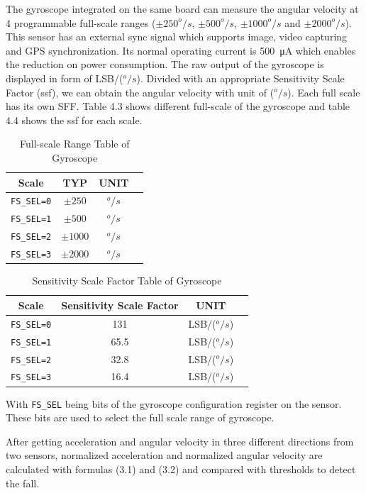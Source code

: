 \documentclass[letterpaper,12pt,titlepage,oneside,final]{book}
\begin{document}
 The gyroscope integrated on the same board can measure the angular velocity at 4 programmable full-scale ranges ($\pm250^{o}/s$, $\pm500^{o}/s$, $\pm1000^{o}/s$ and $\pm2000^{o}/s$). This sensor has an external sync signal which supports image, video capturing and GPS synchronization. Its normal operating current is \SI{500}{\micro\ampere} which enables the reduction on power consumption. The raw output of the gyroscope is displayed in form of LSB/($^{o}/s$). Divided with an appropriate Sensitivity Scale Factor (\gls{ssf}), we can obtain the angular velocity with unit of ($^{o}/s$). Each full scale has its own SFF. Table 4.3 shows different full-scale of the gyroscope and table 4.4 shows the \gls{ssf} for each scale. 
\begin{table}[h!]
	\begin{center}
		\begin{tabular}{ |c|c|c|c| } 
			\hline
			Scale & TYP & UNIT \\
			\hline
			\verb|FS_SEL=0| & $\pm250$ & $^{o}/s$\\ 
			\verb|FS_SEL=1|& $\pm500$ & $^{o}/s$ \\ 
			\verb|FS_SEL=2|& $\pm1000$ & $^{o}/s$ \\
			\verb|FS_SEL=3|& $\pm2000$ & $^{o}/s$\\
			\hline
		\end{tabular}
		\caption{Full-scale Range Table of Gyroscope}
		\label{table:1}
	\end{center}
\end{table}
\begin{table}[h!]
	\begin{center}
		\begin{tabular}{ |c|c|c|c| } 
			\hline
			Scale & Sensitivity Scale Factor & UNIT \\
			\hline
			\verb|FS_SEL=0| & 131 & LSB/($^{o}/s$) \\ 
			\verb|FS_SEL=1|& 65.5 & LSB/($^{o}/s$) \\ 
			\verb|FS_SEL=2|& 32.8 & LSB/($^{o}/s$) \\
			\verb|FS_SEL=3|& 16.4 & LSB/($^{o}/s$)\\
			\hline
		\end{tabular}
		\caption{Sensitivity Scale Factor Table of Gyroscope}
		\label{table:1}
	\end{center}
\end{table}
\newpage
With \verb|FS_SEL| being bits of the gyroscope configuration register on the sensor. These bits are used to select the full scale range of gyroscope. \par 
After getting acceleration and angular velocity in three different directions from two sensors, normalized acceleration and normalized angular velocity are calculated with formulas (3.1) and (3.2) and compared with thresholds to detect the fall. 
\end{document}
